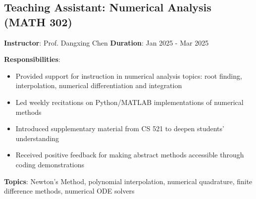 
\subsection*{Teaching Assistant: Numerical Analysis (MATH 302)}

\textbf{Instructor}: Prof. Dangxing Chen \quad \textbf{Duration}: Jan 2025 - Mar 2025

\textbf{Responsibilities}:
\begin{itemize}[leftmargin=1.2em, itemsep=0.1em]
  \item Provided support for instruction in numerical analysis topics: root finding, interpolation, numerical differentiation and integration
  \item Led weekly recitations on Python/MATLAB implementations of numerical methods
  \item Introduced supplementary material from CS 521 to deepen students' understanding
  \item Received positive feedback for making abstract methods accessible through coding demonstrations
\end{itemize}

\vspace{0.5em}

\textbf{Topics}: Newton's Method, polynomial interpolation, numerical quadrature, finite difference methods, numerical ODE solvers


